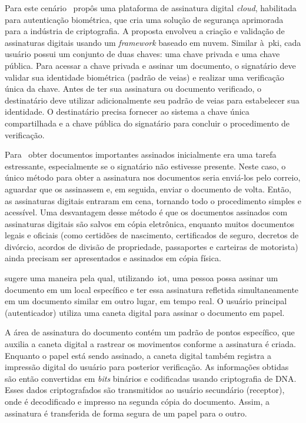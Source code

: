 Para este cenário~\textcite{chakraborty2016} propôs uma plataforma de
assinatura digital \textit{cloud}, habilitada para autenticação biométrica, que
cria uma solução de segurança aprimorada para a indústria de criptografia.
A proposta envolveu a criação e validação de assinaturas digitais usando um
\textit{framework} baseado em nuvem.
Similar à~\acrfull{pki}, cada usuário possui um conjunto de duas chaves: uma
chave privada e uma chave pública.
Para acessar a chave privada e assinar um documento, o signatário deve validar
sua identidade biométrica (padrão de veias) e realizar uma verificação única
da chave.
Antes de ter sua assinatura ou documento verificado, o destinatário deve
utilizar
adicionalmente seu padrão de veias para estabelecer sua identidade.
O destinatário precisa fornecer ao sistema a chave única compartilhada e a chave
pública do signatário para concluir o procedimento de verificação.

Para~\textcite{zachariah2016} obter documentos importantes assinados inicialmente
era uma tarefa estressante, especialmente se o signatário não estivesse presente.
Neste caso, o único método para obter a assinatura nos documentos seria enviá-los
pelo correio, aguardar que os assinassem e, em seguida, enviar o documento de volta.
Então, as assinaturas digitais entraram em cena, tornando todo o procedimento
simples e acessível.
Uma desvantagem desse método é que os documentos assinados com assinaturas
digitais são salvos em cópia eletrônica, enquanto muitos documentos legais e
oficiais (como certidões de nascimento, certificados de seguro, decretos de
divórcio, acordos de divisão de propriedade, passaportes e carteiras de
motorista) ainda precisam ser apresentados e assinados em cópia física\cite{zachariah2016}.

\textcite{zachariah2016} sugere uma maneira pela qual, utilizando~\acrfull{iot},
uma pessoa possa assinar um documento em um local específico e ter essa assinatura
refletida simultaneamente em um documento similar em outro lugar, em tempo real.
O usuário principal (autenticador) utiliza uma caneta digital para assinar o
documento em papel.

A área de assinatura do documento contém um padrão de pontos específico, que
auxilia a caneta digital a rastrear os movimentos conforme a assinatura é criada.
Enquanto o papel está sendo assinado, a caneta digital também registra a
impressão digital do usuário para posterior verificação.
As informações obtidas são então convertidas em \textit{bits} binários e
codificadas usando criptografia de DNA.
Esses dados criptografados são transmitidos ao usuário secundário (receptor),
onde é decodificado e impresso na segunda cópia do documento.
Assim, a assinatura é transferida de forma segura de um papel para o outro\cite{zachariah2016}.

